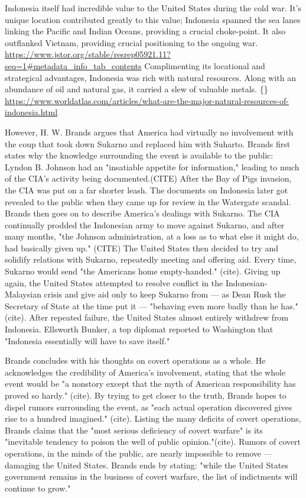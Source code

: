 \documentclass[letterpaper]{article}
\begin{document}
Indonesia itself had incredible value to the United States during the
cold war. It's unique location contributed greatly to this value;
Indonesia spanned the sea lanes linking the Pacific and Indian Oceans,
providing a crucial choke-point. It also outflanked Vietnam, providing
crucial positioning to the ongoing war.
\url{https://www.jstor.org/stable/resrep05921.11?seq=1\#metadata\_info\_tab\_contents}
Complimenting its locational and strategical advantages, Indonesia was
rich with natural resources. Along with an abundance of oil and natural
gas, it carried a slew of valuable metals. \{\}
\url{https://www.worldatlas.com/articles/what-are-the-major-natural-resources-of-indonesia.html}

However, H. W. Brands argues that America had virtually no involvement
with the coup that took down Sukarno and replaced him with Suharto.
Brands first states why the knowledge surrounding the event is available
to the public: Lyndon B. Johnson had an "insatiable appetite for
information," leading to much of the CIA's activity being
documented.(CITE) After the Bay of Pigs invasion, the CIA was put on a
far shorter leash. The documents on Indonesia later got revealed to the
public when they came up for review in the Watergate scandal. Brands
then goes on to describe America's dealings with Sukarno. The CIA
continually prodded the Indonesian army to move against Sukarno, and
after many months, "the Johnson administration, at a loss as to what
else it might do, had basically given up." (CITE) The United States then
decided to try and solidify relations with Sukarno, repeatedly meeting
and offering aid. Every time, Sukarno would send "the Americans home
empty-handed." (cite). Giving up again, the United States attempted to
resolve conflict in the Indonesian-Malaysian crisis and give aid only to
keep Sukarno from --- as Dean Rusk the Secretary of State at the time
put it --- "behaving even more badly than he has."(cite). After repeated
failure, the United States almost entirely withdrew from Indonesia.
Ellsworth Bunker, a top diplomat reported to Washington that "Indonesia
essentially will have to save itself."

Brands concludes with his thoughts on covert operations as a whole. He
acknowledges the credibility of America's involvement, stating that the
whole event would be "a nonstory except that the myth of American
responsibility has proved so hardy." (cite). By trying to get closer to
the truth, Brands hopes to dispel rumors surrounding the event, as "each
actual operation discovered gives rise to a hundred imagined." (cite).
Listing the many deficits of covert operations, Brands claims that the
"most serious deficiency of covert warfare" is its "inevitable tendency
to poison the well of public opinion."(cite). Rumors of covert
operations, in the minds of the public, are nearly impossible to remove
--- damaging the United States. Brands ends by stating: "while the
United States government remains in the business of covert warfare, the
list of indictments will continue to grow."
\end{document}
